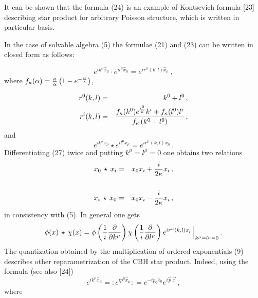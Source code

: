 \documentclass[a4paper,a4paper]{article}
\begin{document}
 It can be shown that the formula (24) is an example of
Kontsevich formula [23]
 describing star product for arbitrary
Poisson structure, which is written in particular basis.

In the case of solvable algebra (5) the formulae (21) and
(23) can be written in closed form as follows:

\begin{equation}
e^{i k^{\mu} \hat{x}_{\mu} }
\cdot
e^{i l^{\mu} \hat{x}_{\mu} }
     =
     e^{i r^{\mu} (k,l)  \hat{x}_{\mu} }\, ,
     \end{equation}
     where
      $f_{\kappa}(\alpha) = {\kappa\over \alpha}
       \left(1 -  e^{- {\alpha\over\kappa}} \right)$,


\begin{eqnarray}     
r^{0}(k,l) &=& k^{0} + l^{0}\, ,
\cr
r^{i}(k,l)  &= & {
f_{\kappa}(k^{0}) e^{l^{0}\over \kappa} k^{i}
 +
 f_{\kappa}(l^{0})  l^{i}
 \over
 f_{\kappa} \left( k^{0} + l^{0} \right) }\, ,
 \end{eqnarray}
 and
 \begin{equation}
 e^{ik^{\mu} x_{\mu}} 
 \star 
  e^{il^{\mu} x_{\mu}}  =
   e^{ir^{\mu}(k,l) x_{\mu}} \, .
     \end{equation}
     Differentiating (27) twice and putting $k^{\mu}= l^{\mu}=0$
one obtains two relations
\begin{eqnarray}
x_{0} \, \star \, x_{i} & = & x_{0} x_{i} + {i\over 2\kappa}
x_{i}\, ,
\cr\cr
x_{i} \, \star \, x_{0} & = & x_{0} x_{i} - {i\over 2\kappa}
x_{i}\, ,
\end{eqnarray}
in consistency with (5). In general one gets
\begin{equation}
\phi(x) \, \star \, \chi (x) =
\phi \left( {1\over i} {\partial \over \partial k^{\mu} } \right)
\chi \left( {1\over i} {\partial \over \partial l^{\mu} } \right)
e^{ir^{\mu} (k,l)x_{\mu} } \Big|_{k^{\mu}=l^{\mu}=0} \, .
\end{equation}
The quantization obtained by the multiplication of ordered
exponentials (9) describes other reparametrization of the CBH
star product. Indeed, using the formula (see also [24])
\begin{equation}
e^{i k^{\mu}\hat{x}_{\mu} } = 
:e^{i p^{\mu}\hat{x}_{\mu} }:
=
e^{- i p_{0}\hat{x}_{0} }
e^{i\vec{p}\, \vec{x} }
\, ,
\end{equation}
where
\end{document}

